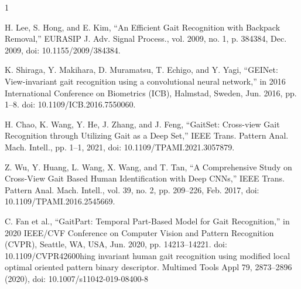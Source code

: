 \documentclass[A4paper,12pt]{report}
\theoremstyle{plain}
\theoremstyle{definition}
\theoremstyle{remark}
\numberwithin{equation}{section}
\renewenvironment{thebibliography}[1]{
  \begin{oldthebibliography}{#1}
    \setlength{\itemsep}{0em}
}
{
  \end{oldthebibliography}
}
\begin{document}
\begin{thebibliography}{1}
 H. Lee, S. Hong, and E. Kim, “An Efficient Gait Recognition with Backpack Removal,” EURASIP J. Adv. Signal Process., vol. 2009, no. 1, p. 384384, Dec. 2009, doi: 10.1155/2009/384384. 

 K. Shiraga, Y. Makihara, D. Muramatsu, T. Echigo, and Y. Yagi, “GEINet: View-invariant gait recognition using a convolutional neural network,” in 2016 International Conference on Biometrics (ICB), Halmstad, Sweden, Jun. 2016, pp. 1–8. doi: 10.1109/ICB.2016.7550060. 

 H. Chao, K. Wang, Y. He, J. Zhang, and J. Feng, “GaitSet: Cross-view Gait Recognition through Utilizing Gait as a Deep Set,” IEEE Trans. Pattern Anal. Mach. Intell., pp. 1–1, 2021, doi: 10.1109/TPAMI.2021.3057879. 

 Z. Wu, Y. Huang, L. Wang, X. Wang, and T. Tan, “A Comprehensive Study on Cross-View Gait Based Human Identification with Deep CNNs,” IEEE Trans. Pattern Anal. Mach. Intell., vol. 39, no. 2, pp. 209–226, Feb. 2017, doi: 10.1109/TPAMI.2016.2545669. 

 C. Fan et al., “GaitPart: Temporal Part-Based Model for Gait Recognition,” in 2020 IEEE/CVF Conference on Computer Vision and Pattern Recognition (CVPR), Seattle, WA, USA, Jun. 2020, pp. 14213–14221. doi: 10.1109/CVPR42600hing invariant human gait recognition using modified local optimal oriented pattern binary descriptor. Multimed Tools Appl 79, 2873–2896 (2020), doi: 10.1007/s11042-019-08400-8





\end{thebibliography}
\end{document}
